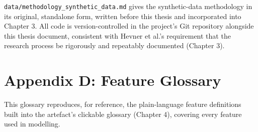 \texttt{data/methodology\_synthetic\_data.md} gives the synthetic-data
methodology in its original, standalone form, written before this thesis
and incorporated into Chapter 3. All code is version-controlled in the
project's Git repository alongside this thesis document, consistent with
Hevner et al.'s \citeyearpar{hevner2004design} requirement that the
research process be rigorously and repeatably documented (Chapter 3).

\hypertarget{appendix-d-feature-glossary}{%
\section*{Appendix D: Feature
Glossary}\label{appendix-d-feature-glossary}}

This glossary reproduces, for reference, the plain-language feature
definitions built into the artefact's clickable glossary (Chapter 4),
covering every feature used in modelling.

